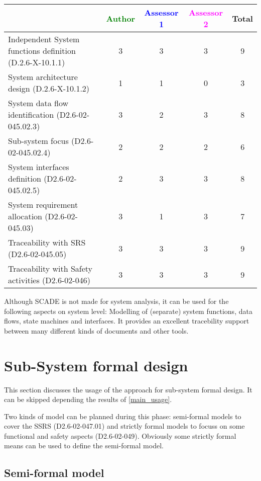\begin{tabular}{|l | c | c | c | c|}
\hline
& \textcolor{green}{Author} & \textcolor{blue}{Assessor 1} & \textcolor{magenta}{Assessor 2} & Total \\
\hline
Independent System functions definition (D.2.6-X-10.1.1)  &
3& 3 &3 &  9 \\
\hline 
System architecture design (D.2.6-X-10.1.2) & 1 & 1 &
0& 3  \\
\hline
System data flow identification (D2.6-02-045.02.3)  &
3& 2 &3 &  8 \\
\hline
Sub-system focus (D2.6-02-045.02.4)  &  2& 2 &2 &  6 \\
\hline
System interfaces definition (D2.6-02-045.02.5)  &
2& 3 &3 & 8  \\
\hline
System requirement allocation (D2.6-02-045.03)  &  3&
1 &3 &  7 \\
\hline
Traceability with SRS (D2.6-02-045.05)  &  3& 3 &3 & 9  \\
\hline
Traceability with Safety activities (D2.6-02-046)  &
3 & 3 &3 & 9  \\
\hline
\end{tabular}

\begin{author_comment}
Although SCADE is not made for system analysis, it can be used for the following aspects on system level: Modelling of (separate) system functions, data flows, state machines and interfaces. It provides an excellent tracebility support between many different kinds of documents and other tools.  
\end{author_comment}


\section{Sub-System formal design}
This section discusses the usage of the approach for sub-system formal design.
It can be skipped depending the results of \ref{main_usage}.

Two kinds of model can be planned during this phase: semi-formal models to  cover the SSRS (D2.6-02-047.01) and strictly formal  models to  focuss on some functional and safety aspects (D2.6-02-049).  Obviously some strictly  formal means can be used to define the semi-formal  model.

\subsection{Semi-formal model}

